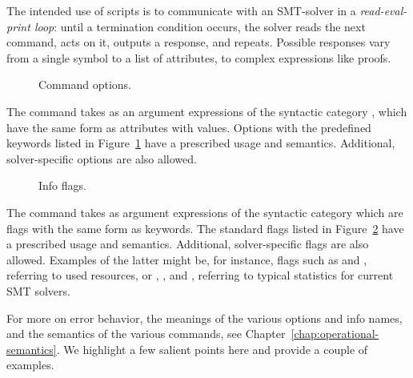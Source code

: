 The intended use of scripts is to communicate with an SMT-solver 
in a \emph{read-eval-print loop}: until a termination condition occurs, 
the solver reads the next command, acts on it, outputs a response, and repeats.
Possible responses vary from a single symbol to a list of attributes, 
to complex expressions like proofs.


\begin{figure}
\small
\cCommandOptions
\caption{Command options.}
\label{fig:command-options}
\end{figure}

The command  takes as an argument expressions 
of the syntactic category , which have the same form 
as attributes with values.
Options with the predefined keywords listed in Figure~\ref{fig:command-options} 
have a prescribed usage and semantics.
Additional, solver-specific options are also allowed.


\begin{figure}
\small
\cInfoFlags
\caption{Info flags.}
\label{fig:info-flags}
\end{figure}

The command  takes as argument 
expressions of the syntactic category 
which are flags with the same form as keywords.
The standard flags listed in Figure~\ref{fig:info-flags} have 
a prescribed usage and semantics.
Additional, solver-specific flags are also allowed.
Examples of the latter might be, for instance, flags such as
 and , referring to used resources, or  
, , and ,
referring to typical statistics for current SMT solvers. 

For more on error behavior, the meanings of the various options and info names,
and the semantics of the various commands, 
see Chapter~\ref{chap:operational-semantics}.
We highlight a few salient points here and provide a couple of examples.


